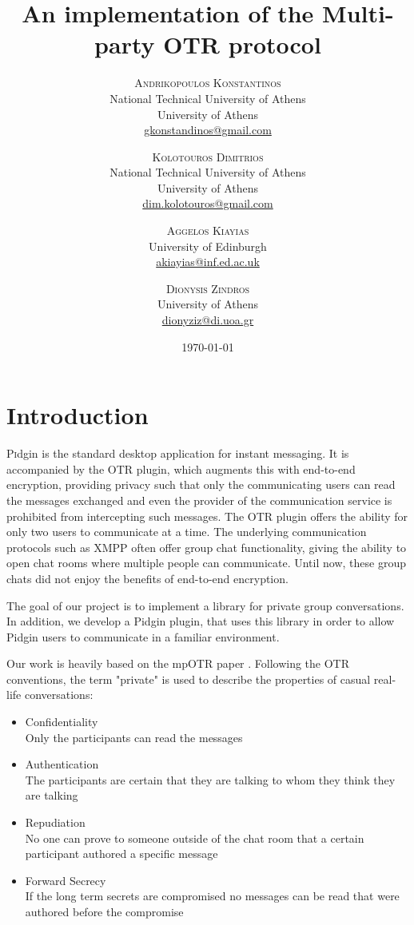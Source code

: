 \documentclass[]{article}
\title{An implementation of the Multi-party OTR protocol} %
\author{%
\textsc{Andrikopoulos Konstantinos}\\[1ex] %
\normalsize National Technical University of Athens \\ %
\normalsize University of Athens \\ %
\normalsize \href{mailto:gkonstandinos@gmail.com}{gkonstandinos@gmail.com} %
\and %
\textsc{Kolotouros Dimitrios} \\[1ex] %
\normalsize National Technical University of Athens \\ %
\normalsize University of Athens \\ %
\normalsize \href{dim.kolotouros@gmail.com}{dim.kolotouros@gmail.com}  %
\and %
\textsc{Aggelos Kiayias} \\[1ex] %
\normalsize University of Edinburgh \\ %
\normalsize \href{mailto:akiayias@inf.ed.ac.uk}{akiayias@inf.ed.ac.uk} \\[1ex]%
\and%
\textsc{Dionysis Zindros} \\[1ex] %
\normalsize University of Athens \\ %
\normalsize \href{mailto:dionyziz@di.uoa.gr}{dionyziz@di.uoa.gr} %
}
\date{\today} %
\begin{document}
\maketitle


\section{Introduction}
\lettrine[nindent=0em,lines=3]{P}idgin is the standard desktop application for instant messaging.
It is accompanied by the OTR plugin, which augments this with end-to-end encryption, providing privacy such that only the communicating users can read the messages exchanged and even the provider of the communication service is prohibited from intercepting such messages.
The OTR plugin offers the ability for only two users to communicate at a time.
The underlying communication protocols such as XMPP often offer group chat functionality, giving the ability to open chat rooms where multiple people can communicate.
Until now, these group chats did not enjoy the benefits of end-to-end encryption.

The goal of our project is to implement a library for private group conversations.
In addition, we develop a Pidgin plugin, that uses this library in order to allow Pidgin users to communicate in a familiar environment.

Our work is heavily based on the mpOTR paper \cite{mpotr}.
Following the OTR conventions, the term "private" is used to describe the properties of casual real-life conversations:

\begin{itemize}
  \item Confidentiality\\
    Only the participants can read the messages\\[0.2cm]

  \item Authentication\\
    The participants are certain that they are talking to whom they think they are talking\\[0.2cm]

  \item Repudiation\\
    No one can prove to someone outside of the chat room that a certain participant authored a specific message\\[0.2cm]

  \item Forward Secrecy\\
    If the long term secrets are compromised no messages can be read that were authored before the compromise\\[0.2cm]

\end{itemize}
\end{document}
